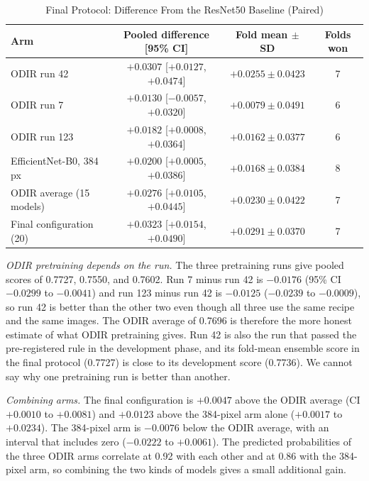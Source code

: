 \begin{table}[!t]
\caption{Final Protocol: Difference From the ResNet50 Baseline (Paired)}
\label{tab:paired}
\centering
\footnotesize
\setlength{\tabcolsep}{3pt}
\begin{tabular}{lccc}
\toprule
Arm & Pooled difference [95\% CI] & Fold mean $\pm$ SD & Folds won \\
\midrule
ODIR run 42 & $+0.0307$ [$+0.0127$, $+0.0474$] & $+0.0255 \pm 0.0423$ & 7 \\
ODIR run 7 & $+0.0130$ [$-0.0057$, $+0.0320$] & $+0.0079 \pm 0.0491$ & 6 \\
ODIR run 123 & $+0.0182$ [$+0.0008$, $+0.0364$] & $+0.0162 \pm 0.0377$ & 6 \\
EfficientNet-B0, 384 px & $+0.0200$ [$+0.0005$, $+0.0386$] & $+0.0168 \pm 0.0384$ & 8 \\
ODIR average (15 models) & $+0.0276$ [$+0.0105$, $+0.0445$] & $+0.0230 \pm 0.0422$ & 7 \\
Final configuration (20) & $+0.0323$ [$+0.0154$, $+0.0490$] & $+0.0291 \pm 0.0370$ & 7 \\
\bottomrule
\end{tabular}
\end{table}

\textit{ODIR pretraining depends on the run.} The three pretraining runs give pooled scores of 0.7727, 0.7550, and 0.7602. Run 7 minus run 42 is $-0.0176$ (95\% CI $-0.0299$ to $-0.0041$) and run 123 minus run 42 is $-0.0125$ ($-0.0239$ to $-0.0009$), so run 42 is better than the other two even though all three use the same recipe and the same images. The ODIR average of 0.7696 is therefore the more honest estimate of what ODIR pretraining gives. Run 42 is also the run that passed the pre-registered rule in the development phase, and its fold-mean ensemble score in the final protocol (0.7727) is close to its development score (0.7736). We cannot say why one pretraining run is better than another.

\textit{Combining arms.} The final configuration is $+0.0047$ above the ODIR average (CI $+0.0010$ to $+0.0081$) and $+0.0123$ above the 384-pixel arm alone ($+0.0017$ to $+0.0234$). The 384-pixel arm is $-0.0076$ below the ODIR average, with an interval that includes zero ($-0.0222$ to $+0.0061$). The predicted probabilities of the three ODIR arms correlate at 0.92 with each other and at 0.86 with the 384-pixel arm, so combining the two kinds of models gives a small additional gain.

